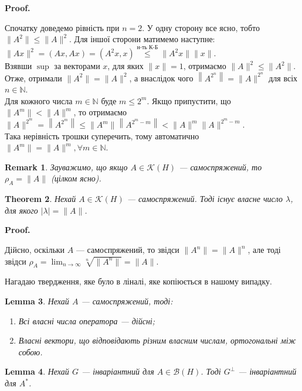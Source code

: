 \documentclass[a4paper, 10pt]{article}
\makeatletter
\theoremstyle{theoremdd}
\newtheorem{theorem}{Theorem}[subsection]
\theoremstyle{theoremdd}
\theoremstyle{theoremdd}
\theoremstyle{theoremdd}
\theoremstyle{theoremdd}
\theoremstyle{theoremdd}
\newtheorem{remark}[theorem]{Remark}
\theoremstyle{theoremdd}
\newtheorem{lemma}[theorem]{Lemma}
\theoremstyle{theoremdd}
\renewenvironment{proof}[1][Proof.\\]{\par
\pushQED{\hfill \qed}%
\normalfont \topsep6\p@\@plus6\p@\relax
\trivlist
\item\relax
{\bfseries
#1\@addpunct{.}}\hspace\labelsep\ignorespaces
}{%
\popQED\endtrivlist\@endpefalse
}
\makeatother
\begin{document}
\begin{proof}
Спочатку доведемо рівність при $n = 2$. У одну сторону все ясно, тобто $\|A^2\| \leq \|A\|^2$. Для іншої сторони матимемо наступне:\\
$\|Ax\|^2 = (Ax,Ax) = (A^2x,x) \overset{\text{н-ть К-Б}}{\leq} \|A^2x\| \|x\|$.\\
Взявши $\sup$ за векторами $x$, для яких $\|x\| = 1$, отримаємо $\|A\|^2 \leq \|A^2\|$.\\
Отже, отримали $\|A^2\| = \|A\|^2$, а внаслідок чого $\left\|A^{2^n}\right\| = \|A\|^{2^n}$ для всіх $n \in \mathbb{N}$.\\
Для кожного числа $m \in \mathbb{N}$ буде $m \leq 2^m$. Якщо припустити, що $\|A^m\| < \|A\|^m$, то отримаємо\\
$\|A\|^{2^m} = \left\|A^{2^m}\right\| \leq \|A^m\| \left\| A^{2^m -m} \right\| < \|A\|^m \|A\|^{2^m - m}$.\\
Така нерівність трошки суперечить, тому автоматично $\|A^m\| = \|A\|^m, \forall m \in \mathbb{N}$.
\end{proof}

\begin{remark}
Зауважимо, що якщо $A \in \mathcal{K}(H)$ --- самоспряжений, то $\rho_A = \|A\|$ (цілком ясно).
\end{remark}

\begin{theorem}
Нехай $A \in \mathcal{K}(H)$ --- самоспряжений. Тоді існує власне число $\lambda$, для якого $|\lambda| = \|A\|$.
\end{theorem}

\begin{proof}
Дійсно, оскільки $A$ --- самоспряжений, то звідси $\|A^n\| = \|A\|^n$, але тоді звідси $\rho_A = \displaystyle\lim_{n \to \infty} \sqrt[n]{\|A^n\|} = \|A\|$.
\end{proof}

Нагадаю твердження, яке було в ліналі, яке копіюється в нашому випадку.
\begin{lemma}
Нехай $A$ --- самоспряжений, тоді:
\begin{enumerate}[nosep,wide=0pt,label={\arabic*)}]
\item Всі власні числа оператора --- дійсні;
\item Власні вектори, що відповідають різним власним числам, ортогональні між собою.
\end{enumerate}
\end{lemma}

\begin{lemma}
Нехай $G$ --- інваріантний для $A \in \mathcal{B}(H)$. Тоді $G^\perp$ --- інваріантний для $A^*$.
\end{lemma}
\end{document}
